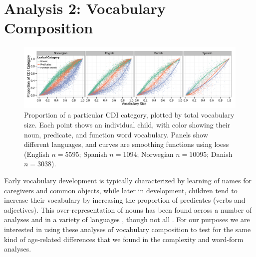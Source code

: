 \documentclass[10pt,letterpaper]{article}
\begin{document}
\section{Analysis 2: Vocabulary Composition}

\begin{figure}[t]
\begin{center}
\includegraphics[width=\textwidth]{plots/composition.png}
\end{center}
\caption{\label{fig:vocab_comp} Proportion of a particular CDI category, plotted by total vocabulary size. Each point shows an individual child, with color showing their noun, predicate, and function word vocabulary. Panels show different languages, and curves are smoothing functions using loess (English $n=5595$; Spanish $n=1094$; Norwegian $n=10095$; Danish $n=3038$).} 
\end{figure}

Early vocabulary development is typically characterized by learning of names for caregivers and common objects, while later in development, children tend to increase their vocabulary by increasing the proportion of predicates (verbs and adjectives). This over-representation of nouns has been found across a number of analyses and in a variety of languages \cite{bates1994,caselli1995,bornstein2004}, though not all \cite{tardif1996,choi1995}.
For our purposes we are interested in using these analyses of vocabulary composition to test for the same kind of age-related differences that we found in the complexity and word-form analyses. 
\end{document}

